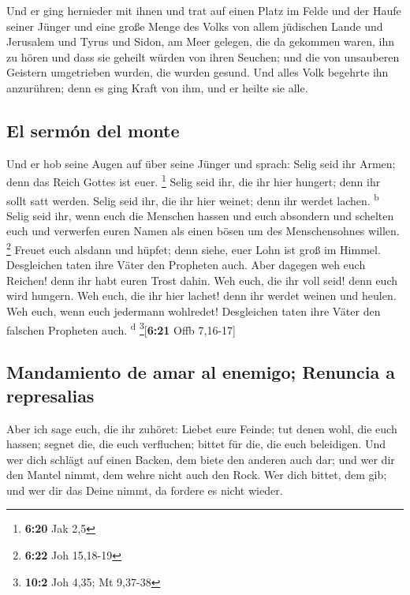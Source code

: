  Und er ging hernieder mit ihnen und trat auf einen Platz
im Felde und der Haufe seiner Jünger und eine große Menge des Volks von
allem jüdischen Lande und Jerusalem und Tyrus und Sidon, am Meer
gelegen,  die da gekommen waren, ihn zu hören und dass
sie geheilt würden von ihren Seuchen; und die von unsauberen Geistern
umgetrieben wurden, die wurden gesund.  Und alles Volk
begehrte ihn anzurühren; denn es ging Kraft von ihm, und er heilte sie
alle.

\hypertarget{el-sermuxf3n-del-monte}{%
\subsection{El sermón del monte}\label{el-sermuxf3n-del-monte}}

 Und er hob seine Augen auf über seine Jünger und sprach:
Selig seid ihr Armen; denn das Reich Gottes ist euer. \footnote{\textbf{6:20}
  Jak 2,5}  Selig seid ihr, die ihr hier hungert; denn
ihr sollt satt werden. Selig seid ihr, die ihr hier weinet; denn ihr
werdet lachen. \textsuperscript{b}  Selig seid ihr, wenn
euch die Menschen hassen und euch absondern und schelten euch und
verwerfen euren Namen als einen bösen um des Menschensohnes willen.
\footnote{\textbf{6:22} Joh 15,18-19}  Freuet euch
alsdann und hüpfet; denn siehe, euer Lohn ist groß im Himmel.
Desgleichen taten ihre Väter den Propheten auch.  Aber
dagegen weh euch Reichen! denn ihr habt euren Trost dahin.
 Weh euch, die ihr voll seid! denn euch wird hungern. Weh
euch, die ihr hier lachet! denn ihr werdet weinen und heulen.
 Weh euch, wenn euch jedermann wohlredet! Desgleichen
taten ihre Väter den falschen Propheten auch. \textsuperscript{d}
\footnote{\textbf{10:2} Joh 4,35; Mt 9,37-38}{[}\textbf{6:21} Offb
7,16-17{]}

\hypertarget{mandamiento-de-amar-al-enemigo-renuncia-a-represalias}{%
\subsection{Mandamiento de amar al enemigo; Renuncia a
represalias}\label{mandamiento-de-amar-al-enemigo-renuncia-a-represalias}}

 Aber ich sage euch, die ihr zuhöret: Liebet eure Feinde;
tut denen wohl, die euch hassen;  segnet die, die euch
verfluchen; bittet für die, die euch beleidigen.  Und wer
dich schlägt auf einen Backen, dem biete den anderen auch dar; und wer
dir den Mantel nimmt, dem wehre nicht auch den Rock.  Wer
dich bittet, dem gib; und wer dir das Deine nimmt, da fordere es nicht
wieder.

